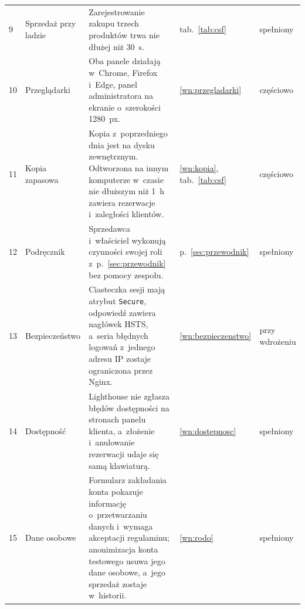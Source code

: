 \documentclass[12pt,a4paper,oneside]{article}
\newcounter{pu}
\begin{document}
{\begin{longtable}{@{}L{0.6cm}L{2.6cm}L{6.6cm}L{2.0cm}L{2.4cm}@{}}
	9 & Sprzedaż przy ladzie & Zarejestrowanie zakupu trzech produktów trwa nie dłużej niż 30~s. & tab.~\ref{tab:csf} & spełniony \\
	10 & Przeglądarki & Oba panele działają w~Chrome, Firefox i~Edge, panel administratora na ekranie o~szerokości 1280~px. & \ref{wn:przegladarki} & częściowo \\
	11 & Kopia zapasowa & Kopia z~poprzedniego dnia jest na dysku zewnętrznym. Odtworzona na innym komputerze w~czasie nie dłuższym niż 1~h zawiera rezerwacje i~zaległości klientów. & \ref{wn:kopia}, tab.~\ref{tab:csf} & częściowo \\
	12 & Podręcznik & Sprzedawca i~właściciel wykonują czynności swojej roli z~p.~\ref{sec:przewodnik} bez pomocy zespołu. & p.~\ref{sec:przewodnik} & spełniony \\
	13 & Bezpieczeństwo & Ciasteczka sesji mają atrybut \texttt{Secure}, odpowiedź zawiera nagłówek HSTS, a~seria błędnych logowań z~jednego adresu IP zostaje ograniczona przez Nginx. & \ref{wn:bezpieczenstwo} & przy wdrożeniu \\
	14 & Dostępność & Lighthouse nie zgłasza błędów dostępności na stronach panelu klienta, a~złożenie i~anulowanie rezerwacji udaje się samą klawiaturą. & \ref{wn:dostepnosc} & spełniony \\
	15 & Dane osobowe & Formularz zakładania konta pokazuje informację o~przetwarzaniu danych i~wymaga akceptacji regulaminu; anonimizacja konta testowego usuwa jego dane osobowe, a~jego sprzedaż zostaje w~historii. & \ref{wn:rodo} & spełniony \\
\end{longtable}
}
\end{document}

